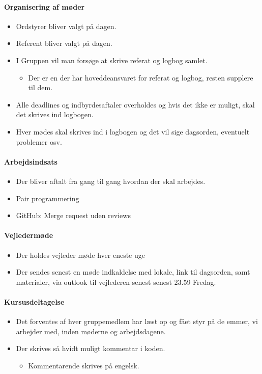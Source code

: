 \paragraph{Organisering af møder}
\begin{itemize}
    \item  Ordstyrer bliver valgt på dagen.
    \item  Referent bliver valgt på dagen.
    \item  I Gruppen vil man forsøge at skrive referat og logbog samlet.
    \begin{itemize}
        \item Der er en der har hoveddeansvaret for referat og logbog, resten supplere til dem.
    \end{itemize}
    \item  Alle deadlines og indbyrdesaftaler overholdes og hvis det ikke er muligt, skal det skrives ind logbogen.
    \item  Hver mødes skal skrives ind i logbogen og det vil sige  dagsorden, eventuelt problemer osv.
\end{itemize}

\paragraph{Arbejdsindsats}
\begin{itemize}
    \item Der bliver aftalt fra gang til gang hvordan der skal arbejdes.
    \item Pair programmering
    \item GitHub: Merge request uden reviews
\end{itemize}

\paragraph{Vejledermøde}
\begin{itemize}
    \item Der holdes vejleder møde hver eneste uge
    \item Der sendes senest en møde indkaldelse med lokale, link til dagsorden, samt materialer, via outlook til vejlederen senest senest 23.59 Fredag.
\end{itemize}

\paragraph{Kursusdeltagelse}
\begin{itemize}
    \item Det forventes af hver gruppemedlem har læst op og fået styr på de emmer, vi arbejder med, inden møderne og arbejdsdagene.
    \item Der skrives så hvidt muligt kommentar i koden.
    \begin{itemize}
        \item Kommentarende skrives på engelsk.
    \end{itemize}
\end{itemize}

